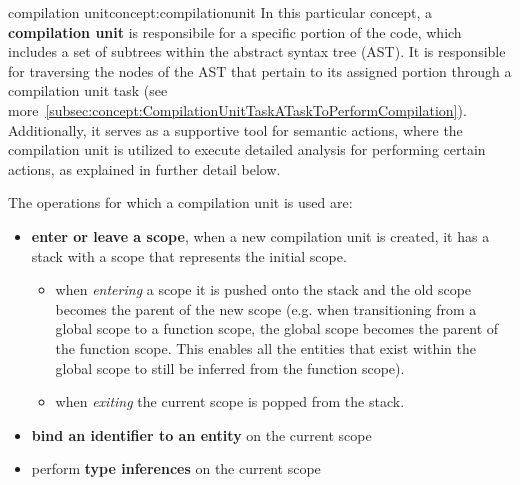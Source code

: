 \begin{mydefinition}{compilation unit}{concept:compilationunit}
    In this particular concept, a \textbf{compilation unit} is responsibile for a specific portion of the code, which includes a set of subtrees within the abstract syntax tree (AST). It is responsible for traversing the nodes of the AST that pertain to its assigned portion through a compilation unit task (see more~\ref{subsec:concept:CompilationUnitTaskATaskToPerformCompilation}). Additionally, it serves as a supportive tool for semantic actions, where the compilation unit is utilized to execute detailed analysis for performing certain actions, as explained in further detail below.
\end{mydefinition}

The operations for which a compilation unit is used are:
\begin{itemize}
    \item \textbf{enter or leave a scope}, when a new compilation unit is created, it has a stack with a scope that represents the initial scope.
        \begin{itemize}
            \item when \textit{entering} a scope it is pushed onto the stack and the old scope becomes the parent of the new scope (e.g. when transitioning from a global scope to a function scope, the global scope becomes the parent of the function scope. This enables all the entities that exist within the global scope to still be inferred from the function scope).
            \item when \textit{exiting} the current scope is popped from the stack.
        \end{itemize}
    \item \textbf{bind an identifier to an entity} on the current scope
    \item perform \textbf{type inferences} on the current scope
\end{itemize}


